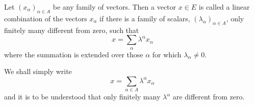 Let $(x_\alpha)_{\alpha \in A}$ be any family of vectors. Then a vector $x \in E$ is called a linear combination of the vectors $x_\alpha$ if there is a family of scalars, $(\lambda_\alpha)_{\alpha \in A}$, only finitely many different from zero, such that
$$x = \sum_{\alpha} \lambda^\alpha x_\alpha$$
where the summation is extended over those $\alpha$ for which $\lambda_\alpha \neq 0$.

We shall simply write
$$x = \sum_{\alpha \in A} \lambda^\alpha x_\alpha$$
and it is to be understood that only finitely many $\lambda^\alpha$ are different from zero.
